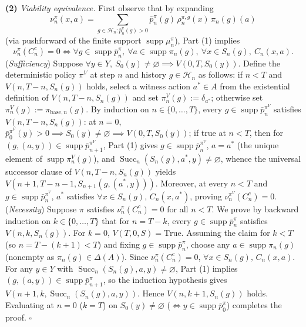 \documentclass[11pt,a4paper]{article}
\newcounter{none}
\begin{document}
\textbf{(2)} \emph{Viability equivalence.} First observe that by
expanding
\[\nu_n^\pi(x,a) = \sum_{g \in \mathcal{H}_n : \bar{p}_n^\pi(g)>0} \bar{p}_n^\pi(g)\, \rho_n^{\pi,g}(x)\, \pi_n(g)(a)\]
(via pushforward of the finite support
\(\operatorname{supp}\mu_n^\pi\)), Part (1) implies
\[\nu_n^\pi(C_n^c) = 0 \iff \forall g \in \operatorname{supp}\bar{p}_n^\pi,\ \forall a \in \operatorname{supp}\pi_n(g),\ \forall x \in S_n(g),\ C_n(x,a).\]
(\emph{Sufficiency}) Suppose
\(\forall y \in Y,\ S_0(y) \neq \varnothing \implies V(0, T, S_0(y))\).
Define the deterministic policy \(\pi^V\) at step \(n\) and history
\(g \in \mathcal{H}_n\) as follows: if \(n < T\) and
\(V(n, T-n, S_n(g))\) holds, select a witness action \(a^* \in A\) from
the existential definition of \(V(n, T-n, S_n(g))\) and set
\(\pi_n^V(g) := \delta_{a^*}\); otherwise set
\(\pi_n^V(g) := \pi_{\mathrm{base}, n}(g)\). By induction on
\(n \in \{0, \dots, T\}\), every
\(g \in \operatorname{supp}\bar{p}_n^{\pi^V}\) satisfies
\(V(n, T-n, S_n(g))\): at \(n=0\),
\(\bar{p}_0^{\pi^V}(y) > 0 \implies S_0(y) \neq \varnothing \implies V(0, T, S_0(y))\);
if true at \(n < T\), then for
\((g, (a, y)) \in \operatorname{supp}\bar{p}_{n+1}^{\pi^V}\), Part (1)
gives \(g \in \operatorname{supp}\bar{p}_n^{\pi^V}\), \(a = a^*\) (the
unique element of \(\operatorname{supp}\pi_n^V(g)\)), and
\(\operatorname{Succ}_n(S_n(g), a^*, y) \neq \varnothing\), whence the
universal successor clause of \(V(n, T-n, S_n(g))\) yields
\(V(n+1, T-n-1, S_{n+1}(g, (a^*, y)))\). Moreover, at every \(n < T\)
and \(g \in \operatorname{supp}\bar{p}_n^{\pi^V}\), \(a^*\) satisfies
\(\forall x \in S_n(g),\, C_n(x, a^*)\), proving
\(\nu_n^{\pi^V}(C_n^c) = 0\). (\emph{Necessity}) Suppose \(\pi\)
satisfies \(\nu_n^\pi(C_n^c) = 0\) for all \(n < T\). We prove by
backward induction on \(k \in \{0, \dots, T\}\) that for \(n = T - k\),
every \(g \in \operatorname{supp}\bar{p}_n^\pi\) satisfies
\(V(n, k, S_n(g))\). For \(k = 0\), \(V(T, 0, S) = \mathrm{True}\).
Assuming the claim for \(k < T\) (so \(n = T - (k+1) < T\)) and fixing
\(g \in \operatorname{supp}\bar{p}_n^\pi\), choose any
\(a \in \operatorname{supp}\pi_n(g)\) (nonempty as
\(\pi_n(g) \in \Delta(A)\)). Since \(\nu_n^\pi(C_n^c) = 0\),
\(\forall x \in S_n(g),\, C_n(x,a)\). For any \(y \in Y\) with
\(\operatorname{Succ}_n(S_n(g), a, y) \neq \varnothing\), Part (1)
implies \((g, (a, y)) \in \operatorname{supp}\bar{p}_{n+1}^\pi\), so the
induction hypothesis gives
\(V(n+1, k, \operatorname{Succ}_n(S_n(g), a, y))\). Hence
\(V(n, k+1, S_n(g))\) holds. Evaluating at \(n = 0\) (\(k = T\)) on
\(S_0(y) \neq \varnothing\)
(\(\iff y \in \operatorname{supp}\bar{p}_0^\pi\)) completes the proof.
\(\square\)
\end{document}
